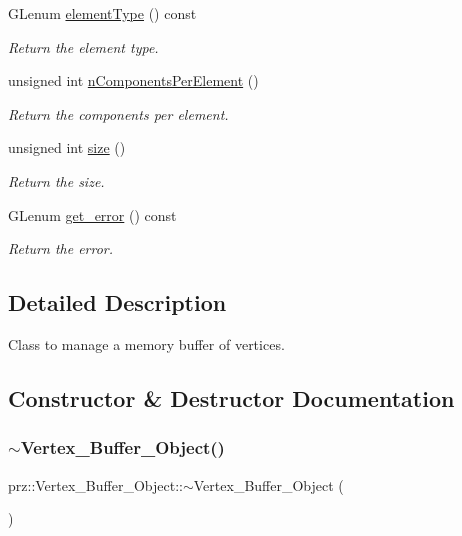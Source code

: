 \begin{DoxyCompactItemize}
G\+Lenum \mbox{\hyperlink{classprz_1_1_vertex___buffer___object_a8a8a3fbc56e01dafa1fe8828dfca3e5b}{element\+Type}} () const
\begin{DoxyCompactList}\small\item\em Return the element type. \end{DoxyCompactList}\item 
unsigned int \mbox{\hyperlink{classprz_1_1_vertex___buffer___object_a473600ea393a66ad6d949b2e0d6b795d}{n\+Components\+Per\+Element}} ()
\begin{DoxyCompactList}\small\item\em Return the components per element. \end{DoxyCompactList}\item 
unsigned int \mbox{\hyperlink{classprz_1_1_vertex___buffer___object_acc2dd595347b27c190d9542b4b624324}{size}} ()
\begin{DoxyCompactList}\small\item\em Return the size. \end{DoxyCompactList}\item 
G\+Lenum \mbox{\hyperlink{classprz_1_1_vertex___buffer___object_a7f588b2a07a856c1edde321ee47ee100}{get\+\_\+error}} () const
\begin{DoxyCompactList}\small\item\em Return the error. \end{DoxyCompactList}\end{DoxyCompactItemize}


\subsection{Detailed Description}
Class to manage a memory buffer of vertices. 



\subsection{Constructor \& Destructor Documentation}
\mbox{\label{classprz_1_1_vertex___buffer___object_af8a4bfaac939c305df32e408c97d1907}} 
\subsubsection{\texorpdfstring{$\sim$Vertex\_Buffer\_Object()}{~Vertex\_Buffer\_Object()}}
{\footnotesize\ttfamily prz\+::\+Vertex\+\_\+\+Buffer\+\_\+\+Object\+::$\sim$\+Vertex\+\_\+\+Buffer\+\_\+\+Object (\begin{DoxyParamCaption}{ }\end{DoxyParamCaption})\hspace{0.3cm}{\ttfamily [inline]}}



